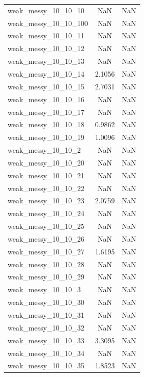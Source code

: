 \begin{longtable}{lcc}
weak\_messy\_10\_10\_10    &      NaN &     NaN \\
weak\_messy\_10\_10\_100   &      NaN &     NaN \\
weak\_messy\_10\_10\_11    &      NaN &     NaN \\
weak\_messy\_10\_10\_12    &      NaN &     NaN \\
weak\_messy\_10\_10\_13    &      NaN &     NaN \\
weak\_messy\_10\_10\_14    &   2.1056 &     NaN \\
weak\_messy\_10\_10\_15    &   2.7031 &     NaN \\
weak\_messy\_10\_10\_16    &      NaN &     NaN \\
weak\_messy\_10\_10\_17    &      NaN &     NaN \\
weak\_messy\_10\_10\_18    &   0.9862 &     NaN \\
weak\_messy\_10\_10\_19    &   1.0096 &     NaN \\
weak\_messy\_10\_10\_2     &      NaN &     NaN \\
weak\_messy\_10\_10\_20    &      NaN &     NaN \\
weak\_messy\_10\_10\_21    &      NaN &     NaN \\
weak\_messy\_10\_10\_22    &      NaN &     NaN \\
weak\_messy\_10\_10\_23    &   2.0759 &     NaN \\
weak\_messy\_10\_10\_24    &      NaN &     NaN \\
weak\_messy\_10\_10\_25    &      NaN &     NaN \\
weak\_messy\_10\_10\_26    &      NaN &     NaN \\
weak\_messy\_10\_10\_27    &   1.6195 &     NaN \\
weak\_messy\_10\_10\_28    &      NaN &     NaN \\
weak\_messy\_10\_10\_29    &      NaN &     NaN \\
weak\_messy\_10\_10\_3     &      NaN &     NaN \\
weak\_messy\_10\_10\_30    &      NaN &     NaN \\
weak\_messy\_10\_10\_31    &      NaN &     NaN \\
weak\_messy\_10\_10\_32    &      NaN &     NaN \\
weak\_messy\_10\_10\_33    &   3.3095 &     NaN \\
weak\_messy\_10\_10\_34    &      NaN &     NaN \\
weak\_messy\_10\_10\_35    &   1.8523 &     NaN \\

\end{longtable}
